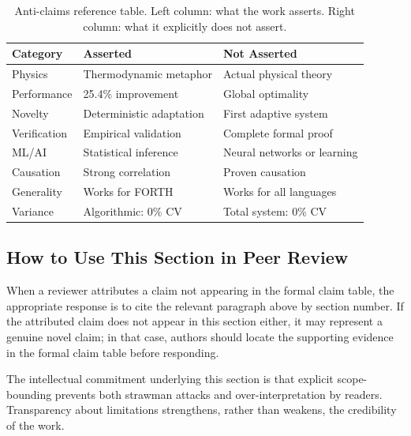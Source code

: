 \begin{table}[h]
\centering
\caption{Anti-claims reference table. Left column: what the work asserts.
Right column: what it explicitly does not assert.}
\label{tab:anti-claims}
\begin{tabular}{lll}
\toprule
\textbf{Category} & \textbf{Asserted} & \textbf{Not Asserted} \\
\midrule
Physics         & Thermodynamic metaphor        & Actual physical theory \\
Performance     & 25.4\% improvement            & Global optimality \\
Novelty         & Deterministic adaptation      & First adaptive system \\
Verification    & Empirical validation          & Complete formal proof \\
ML/AI           & Statistical inference         & Neural networks or learning \\
Causation       & Strong correlation            & Proven causation \\
Generality      & Works for FORTH               & Works for all languages \\
Variance        & Algorithmic: 0\% CV           & Total system: 0\% CV \\
\bottomrule
\end{tabular}
\end{table}

\subsection{How to Use This Section in Peer Review}

When a reviewer attributes a claim not appearing in the formal claim table,
the appropriate response is to cite the relevant paragraph above by section
number. If the attributed claim does not appear in this section either, it may
represent a genuine novel claim; in that case, authors should locate the
supporting evidence in the formal claim table before responding.

The intellectual commitment underlying this section is that explicit
scope-bounding prevents both strawman attacks and over-interpretation by
readers. Transparency about limitations strengthens, rather than weakens, the
credibility of the work.
